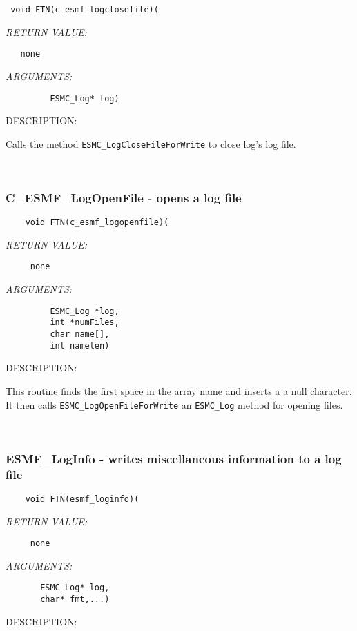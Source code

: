   
\begin{verbatim} 
 void FTN(c_esmf_logclosefile)(\end{verbatim}{\em RETURN VALUE:}
\begin{verbatim}   none\end{verbatim}{\em ARGUMENTS:}
\begin{verbatim}         ESMC_Log* log)\end{verbatim}
{\sf DESCRIPTION:\\ }


   Calls the method {\tt ESMC\_LogCloseFileForWrite} to close log's 
   log file.
   
 
\mbox{}\hrulefill\ 
 

  \subsubsection [C\_ESMF\_LogOpenFile] {C\_ESMF\_LogOpenFile - opens a log file}


\begin{verbatim}    void FTN(c_esmf_logopenfile)(\end{verbatim}{\em RETURN VALUE:}
\begin{verbatim}     none\end{verbatim}{\em ARGUMENTS:}
\begin{verbatim}         ESMC_Log *log, 
         int *numFiles, 
         char name[], 
         int namelen)\end{verbatim}
{\sf DESCRIPTION:\\ }


   This routine finds the first space in the array name and inserts a
   a null character. It then calls {\tt ESMC\_LogOpenFileForWrite} 
   an {\tt ESMC\_Log} method for opening files. 
 
\mbox{}\hrulefill\ 
 
\subsubsection [ESMF\_LogInfo] {ESMF\_LogInfo - writes miscellaneous information to a log file}


  
\begin{verbatim}    void FTN(esmf_loginfo)(\end{verbatim}{\em RETURN VALUE:}
\begin{verbatim}     none\end{verbatim}{\em ARGUMENTS:}
\begin{verbatim}       ESMC_Log* log,
       char* fmt,...)\end{verbatim}
{\sf DESCRIPTION:\\ }


